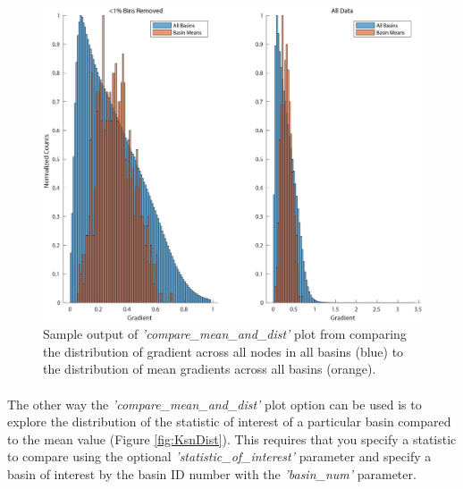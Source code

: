 \begin{figure}[H]
	\centering
	\includegraphics[width=12cm]{PNGs/Gradient_Dist.png}
	\caption{Sample output of \textit{'compare\_mean\_and\_dist'} plot from  comparing the distribution of gradient across all nodes in all basins (blue) to the distribution of mean gradients across all basins (orange).}
	\label{fig:GradDist}
\end{figure}

\paragraph{}The other way the \textit{'compare\_mean\_and\_dist'}  plot option can be used is to explore the distribution of the statistic of interest of a particular basin compared to the mean value (Figure \ref{fig:KsnDist}). This requires that you specify a statistic to compare using the optional \textit{'statistic\_of\_interest'} parameter and specify a basin of interest by the basin ID number with the \textit{'basin\_num'} parameter.


